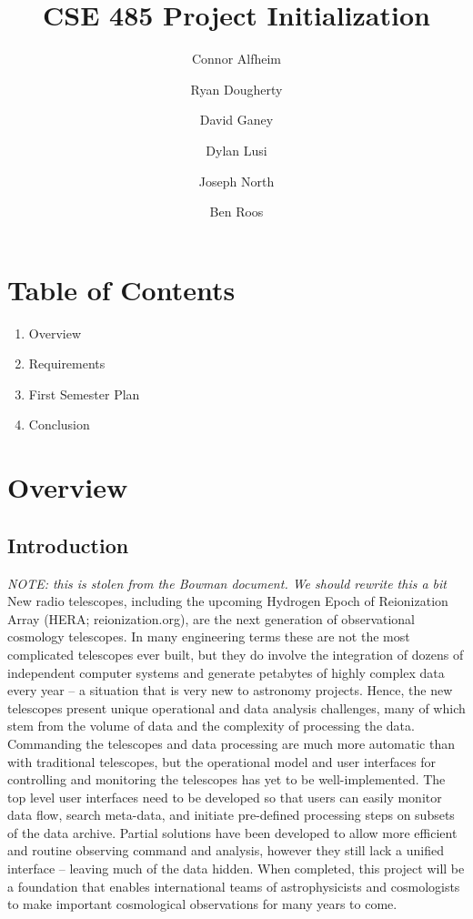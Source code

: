 \documentclass[12pt]{article}
\begin{document}
\begin{spacing}{.4}
\setlength{\droptitle}{-7em}
\title{CSE 485 Project Initialization}
\author{Connor Alfheim \and Ryan Dougherty \and David Ganey \and Dylan Lusi \and Joseph North \and Ben Roos}
\maketitle
\newpage
\end{spacing}

\begin{spacing}{1.5}

\section{Table of Contents}
\begin{enumerate}
\item Overview
\item Requirements
\item First Semester Plan
\item Conclusion
\end{enumerate}
\newpage

\section{Overview}
\subsection{Introduction}
\emph{NOTE: this is stolen from the Bowman document. We should rewrite this a bit}
\newline \newline
New radio telescopes, including the upcoming Hydrogen Epoch of Reionization Array
(HERA; reionization.org), are the next generation of observational cosmology
telescopes. In many engineering terms these are not the most complicated telescopes
ever built, but they do involve the integration of dozens of independent computer
systems and generate petabytes of highly complex data every year – a situation that is
very new to astronomy projects. Hence, the new telescopes present unique
operational and data analysis challenges, many of which stem from the volume of data
and the complexity of processing the data. Commanding the telescopes and data
processing are much more automatic than with traditional telescopes, but the
operational model and user interfaces for controlling and monitoring the telescopes has
yet to be well-implemented. The top level user interfaces need to be developed so that
users can easily monitor data flow, search meta-data, and initiate pre-defined
processing steps on subsets of the data archive. Partial solutions have been developed
to allow more efficient and routine observing command and analysis, however they still
lack a unified interface -- leaving much of the data hidden. When completed, this
project will be a foundation that enables international teams of astrophysicists and
cosmologists to make important cosmological observations for many years to come.


\end{spacing}
\end{document}
